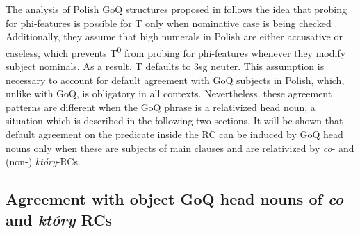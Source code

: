 \documentclass[output=paper]{langsci/langscibook}
\begin{document}
The analysis of Polish GoQ structures proposed in \citet{Witkoś2016} follows the idea that probing for phi-features is possible for T only when nominative case is being checked \citep{Bošković2006}. Additionally, they assume that high numerals in Polish are either accusative or caseless, which prevents T\textsuperscript{0} from probing for phi-features whenever they modify subject nominals. As a result, T defaults to 3sg neuter. This assumption is necessary to account for default agreement with GoQ subjects in Polish, which, unlike with  GoQ, is obligatory in all contexts. Nevertheless, these agreement patterns are different when the GoQ phrase is a relativized head noun, a situation which is described in the following two sections. It will be shown that default agreement on the predicate inside the RC can be induced by GoQ head nouns only when these are subjects of main clauses and are relativized by \textit{co}{}- and (non-) \textit{który}{}-RCs.

\subsection{Agreement with object GoQ head nouns of \textit{co} and \textit{który} RCs}%
 
\end{document}
